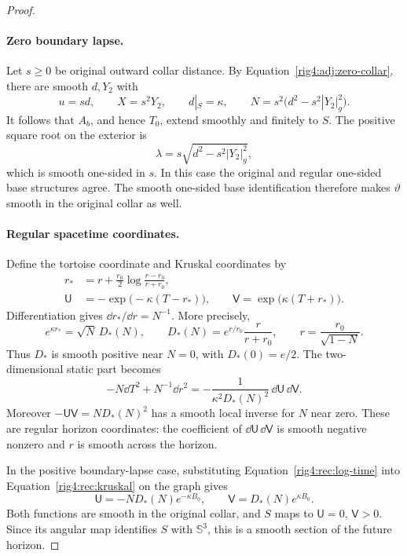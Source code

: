 \begin{proof}
\paragraph{Zero boundary lapse.}
Let $s\geq0$ be original outward collar distance.  By
Equation~\eqref{rig4:adj:zero-collar}, there are smooth $d,Y_2$ with
\begin{equation}
 u=sd,\qquad X=s^2Y_2,\qquad d|_S=\kappa,\qquad
 N=s^2\bigl(d^2-s^2|Y_2|_g^2\bigr).
 \label{rig4:rec:zero-collar}
\end{equation}
It follows that $A_b$, and hence $T_0$, extend smoothly and finitely to $S$.
The positive square root on the exterior is
\[
 \lambda=s\sqrt{d^2-s^2|Y_2|_g^2},
\]
which is smooth one-sided in $s$.  In this case the original and regular
one-sided base structures agree.  The smooth one-sided base identification
therefore makes $\vartheta$ smooth in the original collar as well.

\paragraph{Regular spacetime coordinates.}
Define the tortoise coordinate and Kruskal coordinates by
\begin{equation}
 \begin{split}
 r_*&=r+\frac{r_0}{2}\log\frac{r-r_0}{r+r_0},\\
 \mathsf U&=-\exp\bigl(-\kappa(T-r_*)\bigr),\qquad
 \mathsf V=\exp\bigl(\kappa(T+r_*)\bigr).
 \end{split}
 \label{rig4:rec:kruskal}
\end{equation}
Differentiation gives $\dd r_*/\dd r=N^{-1}$.  More precisely,
\begin{equation}
 e^{\kappa r_*}=\sqrt N\,D_*(N),\qquad
 D_*(N)=e^{r/r_0}\frac{r}{r+r_0},\qquad
 r=\frac{r_0}{\sqrt{1-N}}.
 \label{rig4:rec:regular-factor}
\end{equation}
Thus $D_*$ is smooth positive near $N=0$, with $D_*(0)=e/2$.
The two-dimensional static part becomes
\[
 -N\dd T^2+N^{-1}\dd r^2
   =-\frac{1}{\kappa^2D_*(N)^2}\,\dd\mathsf U\,\dd\mathsf V.
\]
Moreover $-\mathsf U\mathsf V=N D_*(N)^2$ has a smooth local inverse for
$N$ near zero.  These are regular horizon coordinates: the coefficient of
$\dd\mathsf U\,\dd\mathsf V$ is smooth negative nonzero and $r$ is smooth
across the horizon.

In the positive boundary-lapse case, substituting
Equation~\eqref{rig4:rec:log-time} into Equation~\eqref{rig4:rec:kruskal} on the graph
gives
\begin{equation}
 \mathsf U=-N D_*(N)e^{-\kappa B_0},\qquad
 \mathsf V=D_*(N)e^{\kappa B_0}.
 \label{rig4:rec:future-section}
\end{equation}
Both functions are smooth in the original collar, and $S$ maps to
$\mathsf U=0$, $\mathsf V>0$.  Since its angular map identifies $S$ with
$\mathbb S^3$, this is a smooth section of the future horizon.


\end{proof}
